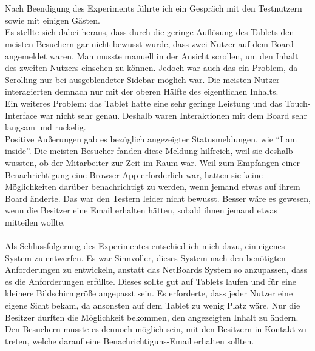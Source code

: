 \\
\\
Nach Beendigung des Experiments führte ich ein Gespräch mit den Testnutzern sowie mit einigen Gästen.
\\
Es stellte sich dabei heraus, dass durch die geringe Auflösung des Tablets den meisten Besuchern gar nicht bewusst wurde, dass zwei Nutzer auf dem Board angemeldet waren. Man musste manuell in der Ansicht scrollen, um den Inhalt des zweiten Nutzers einsehen zu können. Jedoch war auch das ein Problem, da Scrolling nur bei ausgeblendeter Sidebar möglich war. Die meisten Nutzer interagierten demnach nur mit der oberen Hälfte des eigentlichen Inhalts.
\\
Ein weiteres Problem: das Tablet hatte eine sehr geringe Leistung und das Touch-Interface war nicht sehr genau. Deshalb waren Interaktionen mit dem Board sehr langsam und ruckelig.
\\
Positive Äußerungen gab es bezüglich angezeigter Statusmeldungen, wie \bspw ``I am inside''. Die meisten Besucher fanden diese Meldung hilfreich, weil sie deshalb wussten, ob der Mitarbeiter zur Zeit im Raum war.
Weil zum Empfangen einer Benachrichtigung eine Browser-App erforderlich war, hatten sie keine Möglichkeiten darüber benachrichtigt zu werden, wenn jemand etwas auf ihrem Board änderte. Das war den Testern leider nicht bewusst.
Besser wäre es gewesen, wenn die Besitzer eine Email erhalten hätten, sobald ihnen jemand etwas mitteilen wollte.
\\
\\
Als Schlussfolgerung des Experimentes entschied ich mich dazu, ein eigenes System zu entwerfen.
Es war Sinnvoller, dieses System nach den benötigten Anforderungen zu entwickeln, anstatt das NetBoards System so anzupassen, dass es die Anforderungen erfüllte.
Dieses sollte gut auf Tablets laufen und für eine kleinere Bildschirmgröße angepasst sein. Es erforderte, dass jeder Nutzer eine eigene Sicht bekam, da ansonsten auf dem Tablet zu wenig Platz wäre.
Nur die Besitzer durften die Möglichkeit bekommen, den angezeigten Inhalt zu ändern.
Den Besuchern musste es dennoch möglich sein, mit den Besitzern in Kontakt zu treten, welche darauf eine Benachrichtiguns-Email erhalten sollten.
